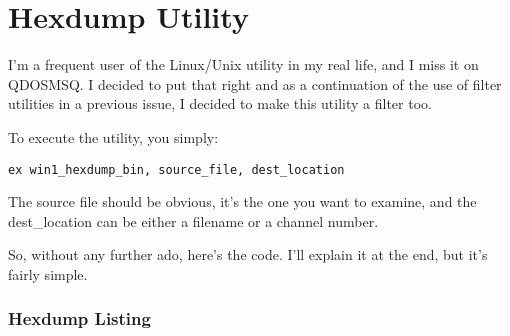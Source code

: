 \chapter{Hexdump Utility}

I'm a frequent user of the Linux/Unix  utility in my real life, and I miss it on QDOSMSQ. I decided to put that right and as a continuation of the use of filter utilities in a previous issue, I decided to make this utility a filter too.

To execute the utility, you simply:

\begin{lstlisting}[frame=none,numbers=none,caption={Executing the Hexdump Utility}]
ex win1_hexdump_bin, source_file, dest_location
\end{lstlisting}

The source file should be obvious, it's the one you want to examine, and the dest\_location can be either a filename or a channel number.

So, without any further ado, here's the code. I'll explain it at the end, but it's fairly simple.

\subsection{Hexdump Listing}

